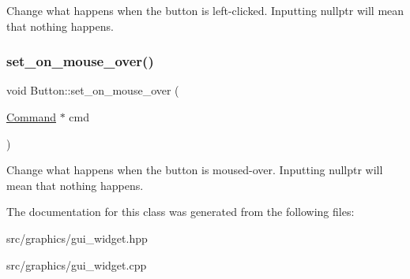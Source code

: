 Change what happens when the button is left-\/clicked. Inputting \textquotesingle{}nullptr\textquotesingle{} will mean that nothing happens. \mbox{\label{class_button_a6133f9b42ae1192df54babd19dec9b80}} 
\subsubsection{\texorpdfstring{set\+\_\+on\+\_\+mouse\+\_\+over()}{set\_on\_mouse\_over()}}
{\footnotesize\ttfamily void Button\+::set\+\_\+on\+\_\+mouse\+\_\+over (\begin{DoxyParamCaption}\item[{\mbox{\hyperlink{class_command}{Command}} $\ast$}]{cmd }\end{DoxyParamCaption})}

Change what happens when the button is moused-\/over. Inputting \textquotesingle{}nullptr\textquotesingle{} will mean that nothing happens. 

The documentation for this class was generated from the following files\+:\begin{DoxyCompactItemize}
\item 
src/graphics/gui\+\_\+widget.\+hpp\item 
src/graphics/gui\+\_\+widget.\+cpp\end{DoxyCompactItemize}
